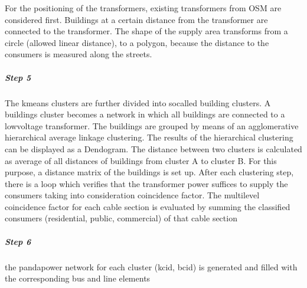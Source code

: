 \documentclass[letterpaper,10pt,english]{sphinxmanual}
\begin{document}
\sphinxAtStartPar
For the positioning of the transformers, existing transformers from OSM are considered first.
Buildings at a certain distance from the transformer are connected to the transformer.
The shape of the supply area transforms
from a circle (allowed linear distance), to a polygon,
because the distance to the consumers is measured along the streets.


\subparagraph{Step 5}
\label{\detokenize{grid_generation/explanation/grid_generation_process:step-5}}
\sphinxAtStartPar
The kmeans clusters are further divided into so\sphinxhyphen{}called building clusters.
A buildings cluster becomes a network in which all buildings are connected to a low\sphinxhyphen{}voltage transformer.
The buildings are grouped
by means of an agglomerative hierarchical average linkage clustering.
The results of the hierarchical clustering can be displayed as a
Dendogram. The distance between two clusters is calculated as
average of all distances of buildings from cluster A to cluster B.
For this purpose, a distance matrix of the buildings is set up. After
each clustering step, there is a loop which verifies that the transformer power suffices to supply the consumers taking
into consideration
coincidence factor. The multilevel coincidence factor for each cable section is
evaluated by summing  the classified consumers (residential, public, commercial) of that cable section


\subparagraph{Step 6}
\label{\detokenize{grid_generation/explanation/grid_generation_process:step-6}}

\begin{fulllineitems}
\label{\detokenize{grid_generation/explanation/grid_generation_process:syngrid.GridGenerator.GridGenerator.install_cables}}
\pysigstartsignatures
{}
\pysigstopsignatures
\sphinxAtStartPar
the pandapower network for each cluster (kcid, bcid) is generated and filled with the corresponding
bus and line elements

\end{fulllineitems}
\end{document}
